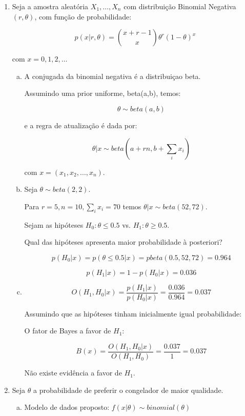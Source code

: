 \documentclass[10pt,brazil,addpoints]{exam}
\begin{document}
\begin{enumerate}[1.]

\item Seja a amostra aleatória $X_1, \ldots, X_n$ com distribuição Binomial Negativa$(r,\theta)$, com função de probabilidade:

$$p(x|r,\theta) = \binom {x+r-1} x \theta^r (1-\theta)^x$$

com $x = 0,1,2,\ldots$

\begin{enumerate}[a)]
\item A conjugada da binomial negativa é a distribuiçao beta.

Assumindo uma prior uniforme, beta(a,b), temos:

$$\theta \sim beta(a,b)$$

e a regra de atualização é dada por:

$$\theta | x \sim beta(a + rn, b + \sum_i x_i)$$

com $x = (x_1, x_2, \ldots, x_n)$.

\item Seja $\theta \sim beta(2,2)$.

Para $r=5, n=10, \sum_i x_i = 70$ temos $\theta|x \sim beta(52,72)$.

Sejam as hipóteses $H_0:\theta \leq 0.5$ vs. $H_1:\theta \geq 0.5$. 

Qual das hipóteses apresenta maior probabilidade à posteriori?

$$p(H_0|x) = p(\theta \leq 0.5|x) = pbeta(0.5,52,72) = 0.964$$

$$p(H_1|x) = 1 - p(H_0|x) = 0.036$$


\item $$O(H_1,H_0|x) = \frac{p(H_1|x)}{p(H_0|x)} = \frac{0.036}{0.964} = 0.037$$

Assumindo que as hipóteses tinham inicialmente igual probabilidade:

O fator de Bayes a favor de $H_1$:

$$B(x) = \frac{O(H_1,H_0|x)}{O(H_1,H_0)} = \frac{0.037}{1} = 0.037$$

Não existe evidência a favor de $H_1$.

\end{enumerate}

\item Seja $\theta$ a probabilidade de preferir o congelador de maior qualidade.

\begin{enumerate}[a)]
\item Modelo de dados proposto: $f(x|\theta) \sim binomial(\theta)$


\end{enumerate}
\end{enumerate}
\end{document}
